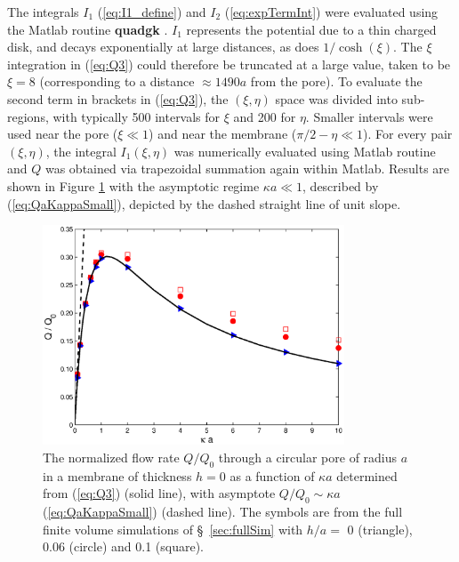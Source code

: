 The integrals $I_1$ (\ref{eq:I1_define}) and $I_2$ (\ref{eq:expTermInt}) were evaluated using the Matlab routine \textbf{quadgk} \cite{matlab}. $I_1$ represents the potential due to a thin charged disk,
and decays exponentially at large distances, as does $1/\cosh(\xi)$. The $\xi$ integration in
(\ref{eq:Q3}) could therefore be truncated at a large value, taken to be $\xi=8$
(corresponding to a distance $\approx 1490a$ from the pore). To evaluate the second term in brackets in (\ref{eq:Q3}), the $(\xi,\eta)$ space was divided into sub-regions, with typically 500 intervals for $\xi$ and 200 for $\eta$. Smaller intervals were used near the pore ($\xi\ll 1$) and near
the membrane ($\pi/2-\eta\ll 1$). For every pair $(\xi,\eta)$, the integral $I_1(\xi,\eta)$ was numerically
evaluated using Matlab routine and $Q$ was obtained via trapezoidal summation again within Matlab. Results are shown in Figure \ref{fig:QaKappa} with the asymptotic regime $\kappa a \ll 1$, described by (\ref{eq:QaKappaSmall}), depicted by the dashed straight line of unit slope. 

\begin{figure}[ht]
\centering
\includegraphics[width = 0.8\textwidth]{zero_thickness/figure2.eps}
\caption{The normalized flow rate $Q/Q_0$ through a circular pore of radius $a$ 
in a membrane of thickness $h=0$ as a function of $\kappa a$ determined from (\ref{eq:Q3})  (solid line), with asymptote $Q/Q_{0} \sim \kappa a$ (\ref{eq:QaKappaSmall}) (dashed line). The symbols are from the full finite volume simulations of \S~\ref{sec:fullSim} with $h/a=$ 0 (triangle), 0.06 (circle) 
and 0.1 (square).}
\label{fig:QaKappa}
\end{figure}

